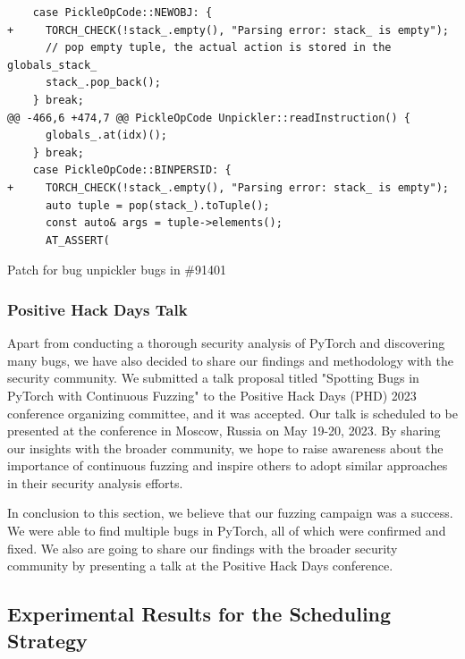 \begin{listing}
    \centering
    \begin{minipage}{0.9\linewidth}
        \begin{verbatim}
    case PickleOpCode::NEWOBJ: {
+     TORCH_CHECK(!stack_.empty(), "Parsing error: stack_ is empty");
      // pop empty tuple, the actual action is stored in the globals_stack_
      stack_.pop_back();
    } break;
@@ -466,6 +474,7 @@ PickleOpCode Unpickler::readInstruction() {
      globals_.at(idx)();
    } break;
    case PickleOpCode::BINPERSID: {
+     TORCH_CHECK(!stack_.empty(), "Parsing error: stack_ is empty");
      auto tuple = pop(stack_).toTuple();
      const auto& args = tuple->elements();
      AT_ASSERT(
    \end{verbatim}
    \end{minipage}
    \caption{Patch for bug unpickler bugs in \#91401}
    \label{listing:pytorch-bug-91401-patch}
\end{listing}

\subsubsection{Positive Hack Days Talk}

Apart from conducting a thorough security analysis of PyTorch and discovering many bugs, we have also decided to share our findings and methodology with the security community. We submitted a talk proposal titled "Spotting Bugs in PyTorch with Continuous Fuzzing" to the Positive Hack Days (PHD) 2023 conference organizing committee, and it was accepted. Our talk is scheduled to be presented at the conference in Moscow, Russia on May 19-20, 2023. By sharing our insights with the broader community, we hope to raise awareness about the importance of continuous fuzzing and inspire others to adopt similar approaches in their security analysis efforts.

In conclusion to this section, we believe that our fuzzing campaign was a success. We were able to find multiple bugs in PyTorch, all of which were confirmed and fixed. We also are going to share our findings with the broader security community by presenting a talk at the Positive Hack Days conference.

\subsection{Experimental Results for the Scheduling Strategy} \label{results:symbolic-pointers-modeling-scheduling}

